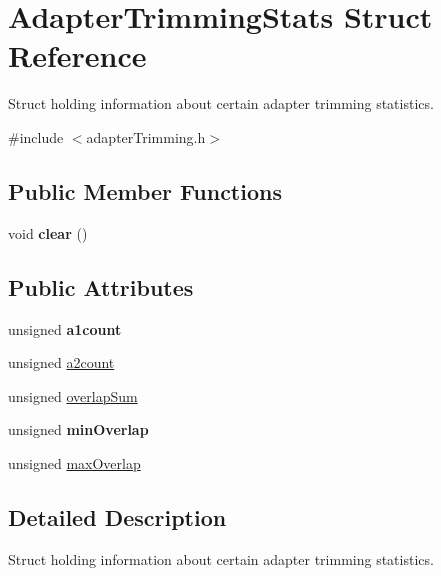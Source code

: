 \hypertarget{struct_adapter_trimming_stats}{\section{Adapter\-Trimming\-Stats Struct Reference}
\label{struct_adapter_trimming_stats}
}


Struct holding information about certain adapter trimming statistics.  




{\ttfamily \#include $<$adapter\-Trimming.\-h$>$}

\subsection*{Public Member Functions}
\begin{DoxyCompactItemize}
\item 
\hypertarget{struct_adapter_trimming_stats_aba2db4f8bdfbf1f9d389bf20a752b8f3}{void {\bfseries clear} ()}\label{struct_adapter_trimming_stats_aba2db4f8bdfbf1f9d389bf20a752b8f3}

\end{DoxyCompactItemize}
\subsection*{Public Attributes}
\begin{DoxyCompactItemize}
\item 
\hypertarget{struct_adapter_trimming_stats_ac2e7c09b2e9b8a080afb148c6f8d4026}{unsigned {\bfseries a1count}}\label{struct_adapter_trimming_stats_ac2e7c09b2e9b8a080afb148c6f8d4026}

\item 
unsigned \hyperlink{struct_adapter_trimming_stats_aabec417e43e59c829ab9172399c2961f}{a2count}
\item 
unsigned \hyperlink{struct_adapter_trimming_stats_a1a223cef64dde7c1a3eb5f7a8da182b5}{overlap\-Sum}
\item 
\hypertarget{struct_adapter_trimming_stats_ac893758e439beec68892ce129b16bc82}{unsigned {\bfseries min\-Overlap}}\label{struct_adapter_trimming_stats_ac893758e439beec68892ce129b16bc82}

\item 
unsigned \hyperlink{struct_adapter_trimming_stats_a3a8e65c4bb3dbd65a51289d07699ad11}{max\-Overlap}
\end{DoxyCompactItemize}


\subsection{Detailed Description}
Struct holding information about certain adapter trimming statistics. 

